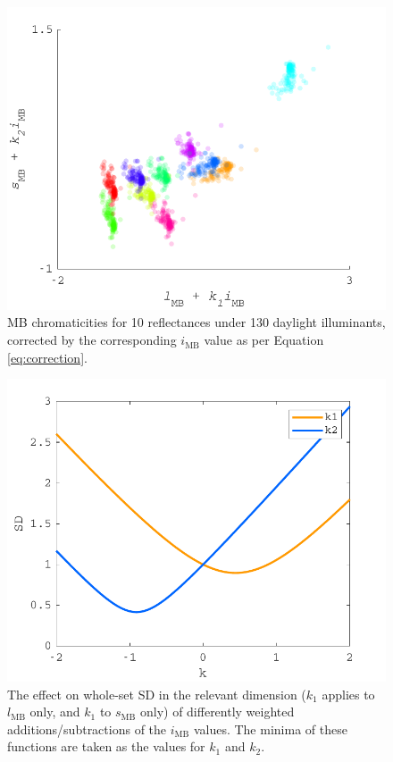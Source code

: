\begin{figure}[htbp]
    \includegraphics[max width=\textwidth]{figs/comp/transformToIllIndSpace/correctedChromaticities.pdf}
    \caption{\gls{MB} chromaticities for 10 reflectances under 130 daylight illuminants, corrected by the corresponding $i_{\text{MB}}$ value as per Equation \ref{eq:correction}.}
    \label{fig:corrected}
\end{figure} 

\begin{figure}[htbp]
    \includegraphics[max width=\textwidth]{figs/comp/transformToIllIndSpace/kvsSD.pdf}
    \caption{The effect on whole-set SD in the relevant dimension ($k_{1}$ applies to $l_{\text{MB}}$ only, and $k_{1}$ to $s_{\text{MB}}$ only) of differently weighted additions/subtractions of the $i_{\text{MB}}$ values. The minima of these functions are taken as the values for $k_{1}$ and $k_{2}$.}
    \label{fig:minSD}
\end{figure} 

